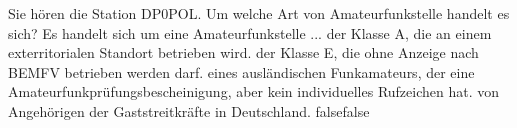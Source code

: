     {Sie hören die Station DP0POL. Um welche Art von Amateurfunkstelle handelt es sich? Es handelt sich um eine Amateurfunkstelle ...}
    {der Klasse A, die an einem exterritorialen Standort betrieben wird.}
    {der Klasse E, die ohne Anzeige nach BEMFV betrieben werden darf.}
    {eines ausländischen Funkamateurs, der eine Amateurfunkprüfungsbescheinigung, aber kein individuelles Rufzeichen hat.}
    {von Angehörigen der Gaststreitkräfte in Deutschland.}
    {false}{false}